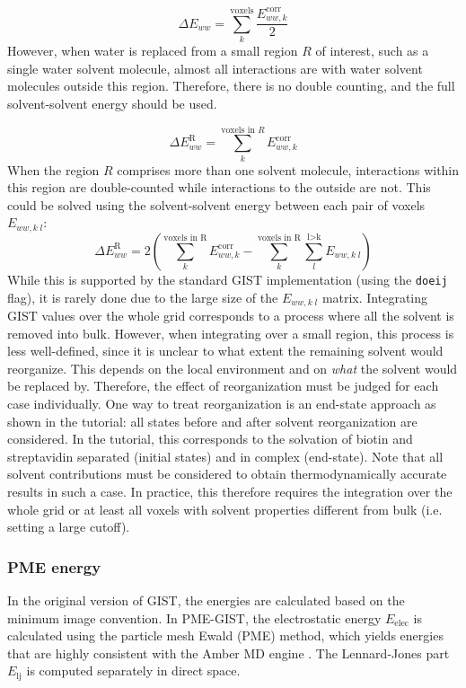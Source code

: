 \documentclass[9pt,tutorial,pubversion]{livecoms}
\newcommand\inlinecode{\texttt}
\begin{document}
\begin{equation}
	\Delta E_{ww} = \sum_{k}^\text{voxels} \frac{E_{ww,k}^\text{corr}}{2}
\end{equation}
However, when water is replaced from a small region $R$ of interest, such as a single water solvent molecule, almost all interactions are with water solvent molecules outside this region.
Therefore, there is no double counting, and the full solvent-solvent energy should be used.

\begin{equation}
	\Delta E^\text{R}_{ww} = \sum_{k}^{\text{voxels in }R} E_{ww,k}^\text{corr}
\end{equation}
When the region $R$ comprises more than one solvent molecule, interactions within this region are double-counted while interactions to the outside are not.
This could be solved using the solvent-solvent energy between each pair of voxels $E_{ww,k\;l}$:
\begin{equation}
	\Delta E^\text{R}_{ww} = 2\left(\sum_{k}^\text{voxels in R} E_{ww,k}^\text{corr}-\sum_{k}^\text{voxels in R}\sum_{l}^\text{l>k} E_{ww, k\;l}\right)
\end{equation}
While this is supported by the standard GIST implementation (using the \inlinecode{doeij} flag), it is rarely done due to the large size of the $E_{ww,k\;l}$ matrix.
Integrating GIST values over the whole grid corresponds to a process where all the solvent is removed into bulk.
However, when integrating over a small region, this process is less well-defined, since it is unclear to what extent the remaining solvent would reorganize.
This depends on the local environment and on \emph{what} the solvent would be replaced by.
Therefore, the effect of reorganization must be judged for each case individually.
One way to treat reorganization is an end-state approach as shown in the tutorial: all states before and after solvent reorganization are considered. 
In the tutorial, this corresponds to the solvation of biotin and streptavidin separated (initial states) and in complex (end-state). 
Note that all solvent contributions must be considered to obtain thermodynamically accurate results in such a case. 
In practice, this therefore requires the integration over the whole grid or at least all voxels with solvent properties different from bulk (i.e. setting a large cutoff).
\subsubsection{PME energy}
In the original version of GIST, the energies are calculated based on the minimum image convention.
In PME-GIST, the electrostatic energy $E_\text{elec}$ is calculated using the particle mesh Ewald (PME) method, which yields energies that are highly consistent with the Amber MD engine \cite{Chen2021}.
The Lennard-Jones part $E_\text{lj}$ is computed separately in direct space.
\end{document}
